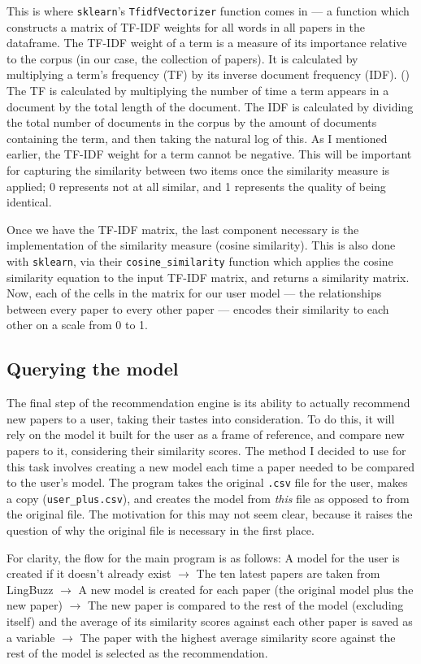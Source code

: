 \documentclass{article}
\begin{document}
This is where \texttt{sklearn}'s \texttt{TfidfVectorizer} function comes in — a function which constructs a matrix of TF-IDF weights for all words in all papers in the dataframe. The TF-IDF weight of a term is a measure of its importance relative to the corpus (in our case, the collection of papers). It is calculated by multiplying a term's frequency (TF) by its inverse document frequency (IDF). (\cite{tfidf}) The TF is calculated by multiplying the number of time a term appears in a document by the total length of the document. The IDF is calculated by dividing the total number of documents in the corpus by the amount of documents containing the term, and then taking the natural log of this. As I mentioned earlier, the TF-IDF weight for a term cannot be negative. This will be important for capturing the similarity between two items once the similarity measure is applied; 0 represents not at all similar, and 1 represents the quality of being identical.  

Once we have the TF-IDF matrix, the last component necessary is the implementation of the similarity measure (cosine similarity). This is also done with \texttt{sklearn}, via their \texttt{cosine\_similarity} function which applies the cosine similarity equation to the input TF-IDF matrix, and returns a similarity matrix. Now, each of the cells in the matrix for our user model — the relationships between every paper to every other paper — encodes their similarity to each other on a scale from 0 to 1.

\subsection{Querying the model}
The final step of the recommendation engine is its ability to actually recommend new papers to a user, taking their tastes into consideration. To do this, it will rely on the model it built for the user as a frame of reference, and compare new papers to it, considering their similarity scores.  
The method I decided to use for this task involves creating a new model each time a paper needed to be compared to the user's model. The program takes the original \texttt{.csv} file for the user, makes a copy (\texttt{user\_plus.csv}), and creates the model from \textit{this} file as opposed to from the original file. The motivation for this may not seem clear, because it raises the question of why the original file is necessary in the first place.  

For clarity, the flow for the main program is as follows: A model for the user is created if it doesn't already exist $\rightarrow$ The ten latest papers are taken from LingBuzz $\rightarrow$ A new model is created for each paper (the original model plus the new paper) $\rightarrow$ The new paper is compared to the rest of the model (excluding itself) and the average of its similarity scores against each other paper is saved as a variable $\rightarrow$ The paper with the highest average similarity score against the rest of the model is selected as the recommendation.  
\end{document}
